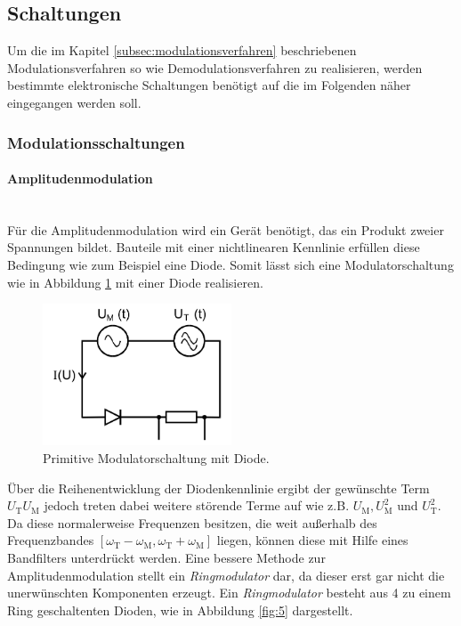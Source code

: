 \FloatBarrier

\subsection{Schaltungen}
\label{subsec:schaltungen}
Um die im Kapitel \ref{subsec:modulationsverfahren}
beschriebenen Modulationsverfahren so wie Demodulationsverfahren zu realisieren, werden
bestimmte elektronische Schaltungen
benötigt auf die im Folgenden näher eingegangen werden soll.

\subsubsection{Modulationsschaltungen}
\label{subsubsec:modulationsschaltungen}
\paragraph{Amplitudenmodulation}
\mbox{}\\
Für die Amplitudenmodulation
wird ein Gerät benötigt, das ein
Produkt zweier Spannungen bildet.
Bauteile mit einer nichtlinearen Kennlinie
erfüllen diese Bedingung wie zum Beispiel eine
Diode.
Somit lässt sich eine Modulatorschaltung
wie in Abbildung \ref{fig:diode}
mit einer Diode realisieren.
\begin{figure}
\centering
\includegraphics[width=0.5\textwidth]{figures/diode.PNG}
\caption{Primitive Modulatorschaltung mit Diode.\cite{sample}}
\label{fig:diode}
\end{figure}
Über die Reihenentwicklung der
Diodenkennlinie ergibt der gewünschte
Term $U_{\text{T}}U_{\text{M}}$ jedoch
treten dabei weitere störende Terme
auf wie z.B. $U_{\text{M}}, U_{\text{M}}^2$ und $U_{\text{T}}^2$.
Da diese normalerweise Frequenzen
besitzen, die weit außerhalb des
Frequenzbandes $[\omega_{\text{T}}-\omega_{\text{M}},\omega_{\text{T}}+\omega_{\text{M}}]$ liegen,
können diese mit Hilfe eines Bandfilters unterdrückt werden.
Eine bessere Methode zur Amplitudenmodulation
stellt ein
\textit{Ringmodulator} dar, da dieser
erst gar nicht die unerwünschten Komponenten
erzeugt.
Ein \textit{Ringmodulator} besteht aus
4 zu einem Ring geschaltenten Dioden,
wie in Abbildung
\ref{fig:5} dargestellt.

